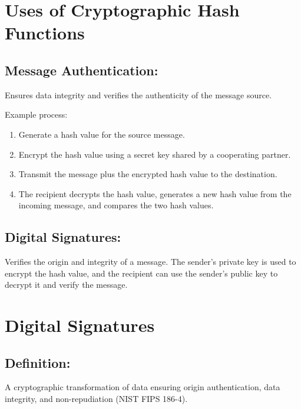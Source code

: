\section{Uses of Cryptographic Hash Functions}

\subsection{Message Authentication:}
Ensures data integrity and verifies the authenticity of the message source. 

Example process:
\begin{enumerate}
    \item Generate a hash value for the source message.
    \item Encrypt the hash value using a secret key shared by a cooperating partner.
    \item Transmit the message plus the encrypted hash value to the destination.
    \item The recipient decrypts the hash value, generates a new hash value from the incoming message, and compares the two hash values.
\end{enumerate}

\subsection{Digital Signatures:}
Verifies the origin and integrity of a message. The sender's private key is used to encrypt the hash value, and the recipient can use the sender's public key to decrypt it and verify the message.

\section{Digital Signatures}

\subsection{Definition:}
A cryptographic transformation of data ensuring origin authentication, data integrity, and non-repudiation (NIST FIPS 186-4).

